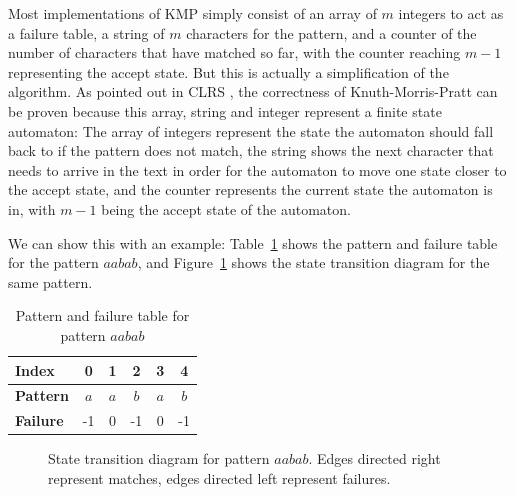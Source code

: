 \documentclass[ %
                    author={Dominic Joseph Moylett},
                    degree={MEng},
                     title={Dictionary Matching with Fingerprints},
                  subtitle={An Empirical Analysis},
                      type={research},
                      year={2015} ]{dissertation}
\begin{document}
Most implementations of KMP simply consist of an array of $m$ integers to act as a failure table, a string of $m$ characters for the pattern, and a counter of the number of characters that have matched so far, with the counter reaching $m - 1$ representing the accept state. But this is actually a simplification of the algorithm. As pointed out in CLRS \cite[pp 1002-1011]{clrs}, the correctness of Knuth-Morris-Pratt can be proven because this array, string and integer represent a finite state automaton: The array of integers represent the state the automaton should fall back to if the pattern does not match, the string shows the next character that needs to arrive in the text in order for the automaton to move one state closer to the accept state, and the counter represents the current state the automaton is in, with $m - 1$ being the accept state of the automaton.

We can show this with an example: Table~\ref{tab:kmp-pattern-failure} shows the pattern and failure table for the pattern $aabab$, and Figure~\ref{fig:kmp-pattern-failure} shows the state transition diagram for the same pattern.

\begin{table}[t]
  \centering
  \begin{tabular}{|l|c|c|c|c|c|}
    \hline
    \textbf{Index} & 0 & 1 & 2 & 3 & 4 \\\hline
    \textbf{Pattern} & $a$ & $a$ & $b$ & $a$ & $b$ \\\hline
    \textbf{Failure} & -1 & 0 & -1 & 0 & -1\\\hline
  \end{tabular}
  \caption{Pattern and failure table for pattern $aabab$}
  \label{tab:kmp-pattern-failure}
\end{table}

\begin{figure}[t]
  \centering
  \caption{State transition diagram for pattern $aabab$. Edges directed right represent matches, edges directed left represent failures.}
  \label{fig:kmp-pattern-failure}
\end{figure}
\end{document}
